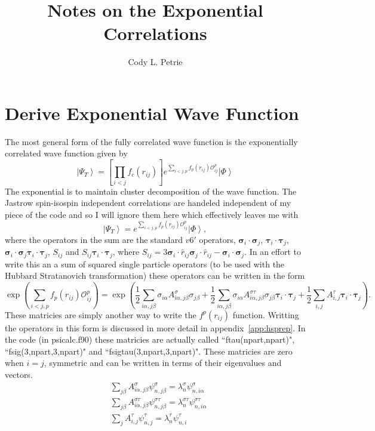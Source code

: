\documentclass[12pt]{extarticle}
\title{Notes on the Exponential Correlations}
\author{Cody L. Petrie}
\newcommand{\Oijp}{\mathcal{O}^p_{ij}}
\newcommand{\ket}[1]{\left| #1 \right>}
\newcommand{\ti}{\bm{\tau}_i}
\newcommand{\tj}{\bm{\tau}_j}
\newcommand{\si}{\bm{\sigma}_i}
\newcommand{\sj}{\bm{\sigma}_j}
\begin{document}
\maketitle

\section{Derive Exponential Wave Function}
The most general form of the fully correlated wave function is the exponentially correlated wave function given by
\begin{equation}
   \ket{\Psi_T} = \left[\prod\limits_{i<j}f_c(r_{ij})\right] e^{\sum\limits_{i<j,p}f_p(r_{ij})\Oijp} \ket{\Phi}
\end{equation}
The exponential is to maintain cluster decomposition of the wave function. The Jastrow spin-isospin independent correlations are handeled independent of my piece of the code and so I will ignore them here which effectively leaves me with
\begin{equation}
   \ket{\Psi_T} = e^{\sum\limits_{i<j,p}f_p(r_{ij})\Oijp} \ket{\Phi},
\end{equation}
where the operators in the sum are the standard $v6'$ operators, $\si\cdot\sj$, $\ti\cdot\tj$, $\si\cdot\sj \ti\cdot\tj$, $S_{ij}$ and $S_{ij} \ti\cdot\tj$, where $S_{ij} = 3\si\cdot\hat{r}_{ij}\sj\cdot\hat{r}_{ij}-\si\cdot\sj$. In an effort to write this an a sum of squared single particle operators (to be used with the Hubbard Stratanovich transformation) these operators can be written in the form
\begin{equation}
   \exp\left(\sum\limits_{i<j,p}f_p(r_{ij})\Oijp\right) = \exp\left(\frac{1}{2}\sum\limits_{i\alpha,j\beta} \sigma_{i\alpha}A^{\sigma}_{i\alpha,j\beta}\sigma_{j\beta}
      + \frac{1}{2}\sum\limits_{i\alpha,j\beta} \sigma_{i\alpha}A^{\sigma\tau}_{i\alpha,j\beta}\sigma_{j\beta}\ti\cdot\tj
      + \frac{1}{2}\sum\limits_{i,j} A^{\tau}_{i,j}\ti\cdot\tj\right).
\end{equation}
These matricies are simply another way to write the $f^p(r_{ij})$ function. Writting the operators in this form is discussed in more detail in appendix~\ref{app:hsprep}. In the code (in psicalc.f90) these matricies are actually called ``ftau(npart,npart)", ``fsig(3,npart,3,npart)" and ``fsigtau(3,npart,3,npart)". These matricies are zero when $i=j$, symmetric and can be written in terms of their eigenvalues and vectors.
\begin{align}
   &\sum\limits_{j\beta} A^{\sigma}_{i\alpha,j\beta}\psi^{\sigma}_{n,j\beta} = \lambda^{\sigma}_n\psi^{\sigma}_{n,i\alpha} \\
   &\sum\limits_{j\beta} A^{\sigma\tau}_{i\alpha,j\beta}\psi^{\sigma\tau}_{n,j\beta} = \lambda^{\sigma\tau}_n\psi^{\sigma\tau}_{n,i\alpha} \\
   &\sum\limits_{j} A^{\tau}_{i,j}\psi^{\tau}_{n,j} = \lambda^{\tau}_n\psi^{\tau}_{n,i}
\end{align}
\end{document}

